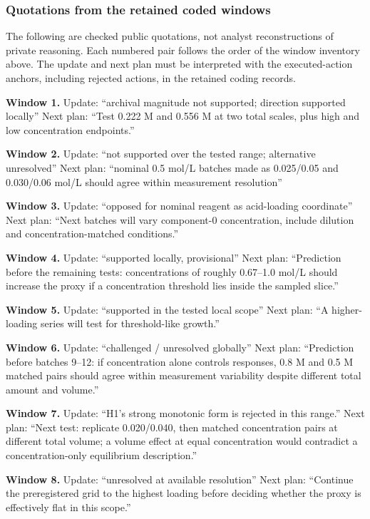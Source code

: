 \documentclass[10pt,a4paper]{article}
\begin{document}
\subsubsection{Quotations from the retained coded windows}\label{quotations-from-the-retained-coded-windows}

The following are checked public quotations, not analyst reconstructions of private reasoning. Each numbered pair follows the order of the window inventory above. The update and next plan must be interpreted with the executed-action anchors, including rejected actions, in the retained coding records.

\textbf{Window 1.} Update: ``archival magnitude not supported; direction supported locally'' Next plan: ``Test 0.222 M and 0.556 M at two total scales, plus high and low concentration endpoints.''

\textbf{Window 2.} Update: ``not supported over the tested range; alternative unresolved'' Next plan: ``nominal 0.5 mol/L batches made as 0.025/0.05 and 0.030/0.06 mol/L should agree within measurement resolution''

\textbf{Window 3.} Update: ``opposed for nominal reagent as acid-loading coordinate'' Next plan: ``Next batches will vary component-0 concentration, include dilution and concentration-matched conditions.''

\textbf{Window 4.} Update: ``supported locally, provisional'' Next plan: ``Prediction before the remaining tests: concentrations of roughly 0.67--1.0 mol/L should increase the proxy if a concentration threshold lies inside the sampled slice.''

\textbf{Window 5.} Update: ``supported in the tested local scope'' Next plan: ``A higher-loading series will test for threshold-like growth.''

\textbf{Window 6.} Update: ``challenged / unresolved globally'' Next plan: ``Prediction before batches 9--12: if concentration alone controls responses, 0.8 M and 0.5 M matched pairs should agree within measurement variability despite different total amount and volume.''

\textbf{Window 7.} Update: ``H1's strong monotonic form is rejected in this range.'' Next plan: ``Next test: replicate 0.020/0.040, then matched concentration pairs at different total volume; a volume effect at equal concentration would contradict a concentration-only equilibrium description.''

\textbf{Window 8.} Update: ``unresolved at available resolution'' Next plan: ``Continue the preregistered grid to the highest loading before deciding whether the proxy is effectively flat in this scope.''
\end{document}
